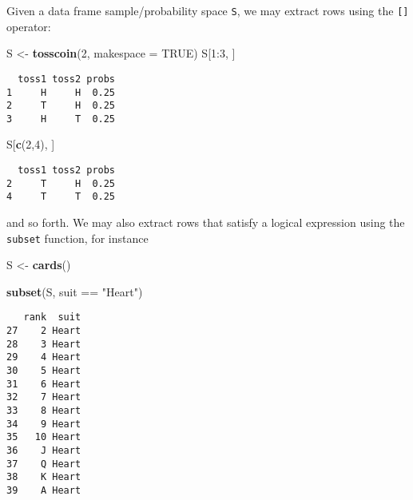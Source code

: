 \documentclass[]{book}
\newenvironment{Shaded}{\begin{snugshade}}{\end{snugshade}}
\newcommand{\KeywordTok}[1]{\textcolor[rgb]{0.13,0.29,0.53}{\textbf{{#1}}}}
\newcommand{\DataTypeTok}[1]{\textcolor[rgb]{0.13,0.29,0.53}{{#1}}}
\newcommand{\DecValTok}[1]{\textcolor[rgb]{0.00,0.00,0.81}{{#1}}}
\newcommand{\StringTok}[1]{\textcolor[rgb]{0.31,0.60,0.02}{{#1}}}
\newcommand{\OtherTok}[1]{\textcolor[rgb]{0.56,0.35,0.01}{{#1}}}
\newcommand{\NormalTok}[1]{{#1}}
\numberwithin{equation}{chapter}
\numberwithin{figure}{chapter}
\theoremstyle{plain}
\theoremstyle{definition}
\theoremstyle{remark}
\theoremstyle{definition}
\theoremstyle{definition}
\theoremstyle{remark}
\begin{document}
Given a data frame sample/probability space \texttt{S}, we may extract
rows using the \texttt{{[}{]}} operator:

\begin{Shaded}
\begin{Highlighting}[]
\NormalTok{S <-}\StringTok{ }\KeywordTok{tosscoin}\NormalTok{(}\DecValTok{2}\NormalTok{, }\DataTypeTok{makespace =} \OtherTok{TRUE}\NormalTok{) }
\NormalTok{S[}\DecValTok{1}\NormalTok{:}\DecValTok{3}\NormalTok{, ] }
\end{Highlighting}
\end{Shaded}

\begin{verbatim}
  toss1 toss2 probs
1     H     H  0.25
2     T     H  0.25
3     H     T  0.25
\end{verbatim}

\begin{Shaded}
\begin{Highlighting}[]
\NormalTok{S[}\KeywordTok{c}\NormalTok{(}\DecValTok{2}\NormalTok{,}\DecValTok{4}\NormalTok{), ] }
\end{Highlighting}
\end{Shaded}

\begin{verbatim}
  toss1 toss2 probs
2     T     H  0.25
4     T     T  0.25
\end{verbatim}

and so forth. We may also extract rows that satisfy a logical expression
using the \texttt{subset} function, for instance

\begin{Shaded}
\begin{Highlighting}[]
\NormalTok{S <-}\StringTok{ }\KeywordTok{cards}\NormalTok{() }
\end{Highlighting}
\end{Shaded}

\begin{Shaded}
\begin{Highlighting}[]
\KeywordTok{subset}\NormalTok{(S, suit ==}\StringTok{ "Heart"}\NormalTok{) }
\end{Highlighting}
\end{Shaded}

\begin{verbatim}
   rank  suit
27    2 Heart
28    3 Heart
29    4 Heart
30    5 Heart
31    6 Heart
32    7 Heart
33    8 Heart
34    9 Heart
35   10 Heart
36    J Heart
37    Q Heart
38    K Heart
39    A Heart
\end{verbatim}
\end{document}
